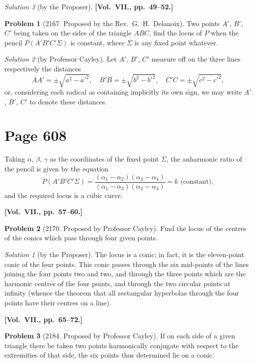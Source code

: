 \documentclass[12pt,a4paper]{article}
\theoremstyle{plain}
\theoremstyle{definition}
\newtheorem{problem}{Problem}
\theoremstyle{remark}
\newtheorem*{solution}{Solution}
\begin{document}
\begin{solution}[by the Proposer]
\medskip\noindent\textbf{[Vol.~VII., pp.~49--52.]}

\begin{problem}[2167. Proposed by the Rev.~G.~H.~Delanoix]
Two points $A'$, $B'$, $C'$ being taken on the sides of the triangle $ABC$, find the locus of $P$ when the pencil $P(A'B'C'\Sigma)$ is constant, where $\Sigma$ is any fixed point whatever.
\end{problem}

\begin{solution}[by Professor Cayley]
Let $A'$, $B'$, $C'$ measure off on the three lines respectively the distances
\[
AA' = \pm\sqrt{a^2 - a'^2}, \quad
B'B = \pm\sqrt{b^2 - b'^2}, \quad
C'C = \pm\sqrt{c^2 - c'^2},
\]
or, considering each radical as containing implicitly its own sign, we may write $A'$, $B'$, $C'$ to denote these distances.

\section*{Page 608}
\setcounter{page}{608}

Taking $\alpha$, $\beta$, $\gamma$ as the coordinates of the fixed point $\Sigma$, the anharmonic ratio of the pencil is given by the equation
\[
P(A'B'C'\Sigma) = \frac{(\alpha_1 - \alpha_2)(\alpha_3 - \alpha_4)}{(\alpha_1 - \alpha_3)(\alpha_2 - \alpha_4)} = k \text{ (constant)},
\]
and the required locus is a cubic curve.

\medskip\noindent\textbf{[Vol.~VII., pp.~57--60.]}

\begin{problem}[2170. Proposed by Professor Cayley]
Find the locus of the centres of the conics which pass through four given points.
\end{problem}

\begin{solution}[by the Proposer]
The locus is a conic; in fact, it is the eleven-point conic of the four points. This conic passes through the six mid-points of the lines joining the four points two and two, and through the three points which are the harmonic centres of the four points, and through the two circular points at infinity (whence the theorem that all rectangular hyperbolas through the four points have their centres on a line).
\end{solution}

\medskip\noindent\textbf{[Vol.~VII., pp.~65--72.]}

\begin{problem}[2184. Proposed by Professor Cayley]
If on each side of a given triangle there be taken two points harmonically conjugate with respect to the extremities of that side, the six points thus determined lie on a conic.
\end{problem}


\end{solution}
\end{solution}
\end{document}
